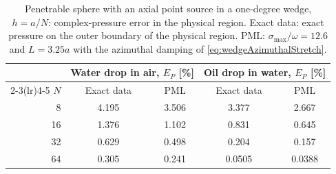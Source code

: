 \begin{table}[htbp]
\centering
\small
\setlength{\tabcolsep}{5pt}
\begin{tabular}{rcccc}
\toprule
& \multicolumn{2}{c}{Water drop in air, $E_P$ [\%]} & \multicolumn{2}{c}{Oil drop in water, $E_P$ [\%]} \\
\cmidrule(lr){2-3}\cmidrule(lr){4-5}
$N$ & Exact data & PML & Exact data & PML \\
\midrule
8 & 4.195 & 3.506 & 3.377 & 2.667 \\
16 & 1.376 & 1.102 & 0.831 & 0.645 \\
32 & 0.629 & 0.498 & 0.204 & 0.157 \\
64 & 0.305 & 0.241 & 0.0505 & 0.0388 \\
\bottomrule
\end{tabular}
\caption{Penetrable sphere with an axial point source in a one-degree wedge,
$h=a/N$: complex-pressure error in the physical region.  Exact data:
exact pressure on the outer boundary of the physical region.  PML:
$\sigma_{\max}/\omega=12.6$ and $L=3.25a$ with the azimuthal damping of
\cref{eq:wedgeAzimuthalStretch}.}
\label{tab:spherePML}
\end{table}
